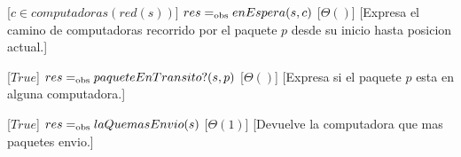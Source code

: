 \begin{Interfaz}
  
  [$ c \in computadoras(red(s)) $]  
  {$res =_{\mathrm{obs}} enEspera(s, c)$}
  [$\Theta()$]
  [Expresa el camino de computadoras recorrido por el paquete $p$ desde su inicio hasta posicion actual.]


  [$ True $]  
  {$res =_{\mathrm{obs}} paqueteEnTransito?(s, p)$}
  [$\Theta()$]
  [Expresa si el paquete $p$ esta en alguna computadora.]
  
  
  [$ True $]
  {$res =_{\mathrm{obs}} laQuemasEnvio(s)$}
  [$\Theta(1)$]
  [Devuelve la computadora que mas paquetes envio.]
  

\end{Interfaz}

